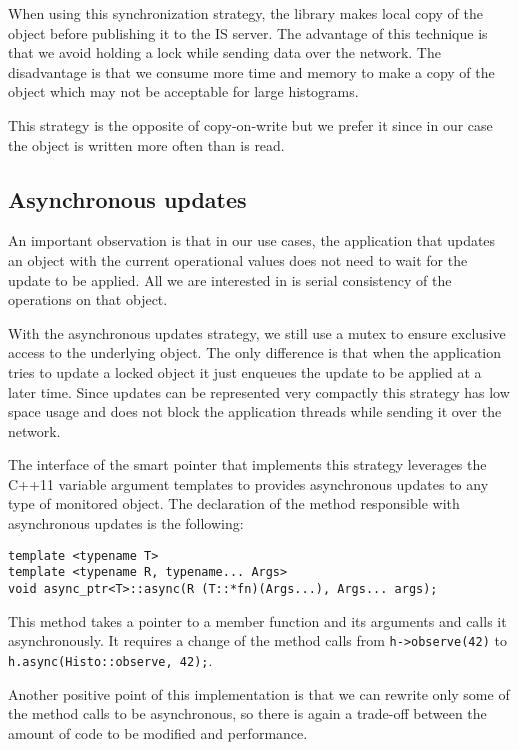 When using this synchronization strategy, the library makes local copy of the object before publishing it to the IS server. The advantage of this technique is that we avoid holding a lock while sending data over the network. The disadvantage is that we consume more time and memory to make a copy of the object which may not be acceptable for large histograms.

This strategy is the opposite of copy-on-write but we prefer it since in our case the object is written more often than is read.

\subsection*{Asynchronous updates}

An important observation is that in our use cases, the application that updates an object with the current operational values does not need to wait for the update to be applied. All we are interested in is serial consistency of the operations on that object. 

With the asynchronous updates strategy, we still use a mutex to ensure exclusive access to the underlying object. The only difference is that when the application tries to update a locked object it just enqueues the update to be applied at a later time. Since updates can be represented very compactly this strategy has low space usage and does not block the application threads while sending it over the network.

The interface of the smart pointer that implements this strategy leverages the C++11 variable argument templates to provides asynchronous updates to any type of monitored object. The declaration of the method responsible with asynchronous updates is the following:

\begin{verbatim}
template <typename T>
template <typename R, typename... Args>
void async_ptr<T>::async(R (T::*fn)(Args...), Args... args);
\end{verbatim}

This method takes a pointer to a member function and its arguments and calls it asynchronously. It requires a change of the method calls from \verb+h->observe(42)+ to \verb+h.async(Histo::observe, 42);+.

Another positive point of this implementation is that we can rewrite only some of the method calls to be asynchronous, so there is again a trade-off between the amount of code to be modified and performance.

